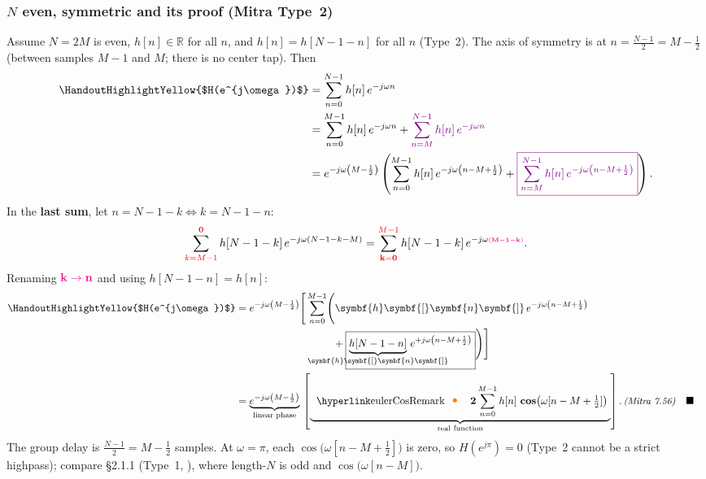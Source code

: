 \documentclass[handout_subfiles_root.tex]{subfiles}
\begin{document}
\subsubsection{$N$ even, symmetric and its proof (Mitra Type~2)}
\noindent Assume $N = 2M$ is even, $h[n]\in\mathbb{R}$ for all $n$, and $h[n] = h[N-1-n]$ for all $n$ (Type~2). The axis of symmetry is at $n=\tfrac{N-1}{2}=M-\tfrac{1}{2}$ (between samples $M-1$ and $M$; there is no center tap). Then
\begin{align*}
\HandoutHighlightYellow{$H(e^{j\omega})$} &= \sum_{n=0}^{N-1} h[n]\,e^{-j\omega n} \\
&= \sum_{n=0}^{M-1} h[n]\,e^{-j\omega n}
+ {\color{ee483lastsum}\sum_{n=M}^{N-1} h[n]\,e^{-j\omega n}} \\
&= e^{-j\omega\left(M-\frac{1}{2}\right)}\left(\sum_{n=0}^{M-1} h[n]\,e^{-j\omega\left(n-M+\frac{1}{2}\right)} + \fcolorbox{ee483lastsum}{white}{\color{ee483lastsum}$\displaystyle\sum_{n=M}^{N-1} h[n]\,e^{-j\omega\left(n-M+\frac{1}{2}\right)}$}\right).
\end{align*}
In the \textcolor{ee483lastsum}{\textbf{last sum}}, let $n = N-1-k \iff k = N-1-n$:
\begin{equation*}
\sum_{\textcolor{red}{k=M-1}}^{\textcolor{red}{\mathbf{0}}} h[N-1-k]\,e^{-j\omega(N-1-k-M)} = \sum_{\textcolor{red}{\mathbf{k=0}}}^{\textcolor{red}{M-1}} h[N-1-k]\,e^{-j\omega\HandoutPinkSup{(M-1-k)}}.
\end{equation*}
%
Renaming $\HandoutPinkEmph{k\to n}$ and using $h[N-1-n]=h[n]$:
\begin{align*}
\HandoutHighlightYellow{$H(e^{j\omega})$} &= e^{-j\omega\left(M-\frac{1}{2}\right)}\Bigg[\sum_{n=0}^{M-1}\Biggl( \symbf{h}\symbf{[}\symbf{n}\symbf{]}\,e^{-j\omega\left(n-M+\frac{1}{2}\right)} \notag\\
&\hspace{9.4em} + \boxed{\underbrace{h[N-1-n]}_{\HandoutUnderbraceLabel{\symbf{h}\symbf{[}\symbf{n}\symbf{]}}}\,e^{+j\omega\left(n-M+\frac{1}{2}\right)}}\Biggr)\Bigg] \\
&= \underbrace{e^{-j\omega\left(M-\frac{1}{2}\right)}}_{\HandoutUnderbraceLabel{\text{linear phase}}}\,
\left[\underbrace{\mkern5mu \HandoutEulerMarkLinkMath\,\mathbf{2}\sum_{n=0}^{M-1} h[n]\,\mathop{\mathbf{cos}\!}\big(\omega[n-M+\tfrac{1}{2}]\big)\mkern5mu}_{\HandoutUnderbraceLabel{\text{real function}}}\right].\MitraEq{7.56} && \HandoutQEDalign
\end{align*}
\noindent The group delay is $\tfrac{N-1}{2}=M-\tfrac{1}{2}$ samples. At $\omega=\pi$, each $\cos\big(\omega[n-M+\tfrac{1}{2}]\big)$ is zero, so $H(e^{j\pi})=0$ (Type~2 cannot be a strict highpass); compare §2.1.1 (Type~1, ), where length-$N$ is odd and $\cos\big(\omega[n-M]\big)$.
\end{document}
